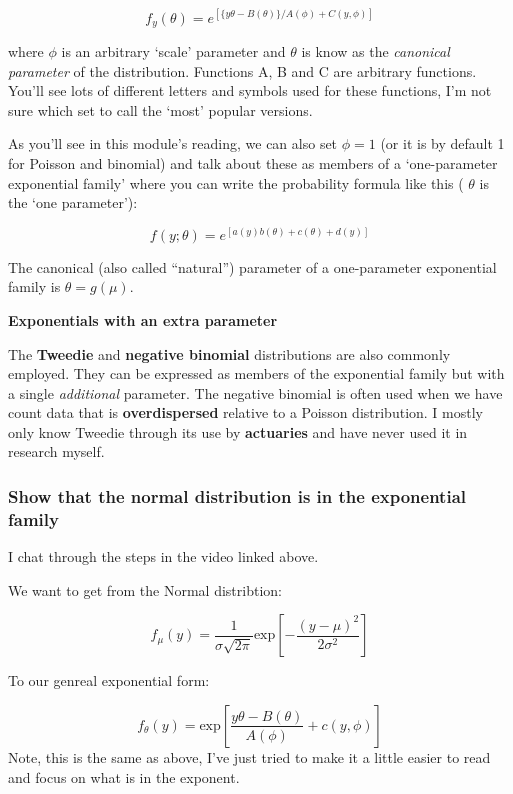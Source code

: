 \documentclass[
  openany]{book}
\begin{document}
\[f_y(\theta)=e^{[ \{y\theta-B(\theta)\}/A(\phi)+C(y, \phi)]}\]

where \(\phi\) is an arbitrary `scale' parameter and \(\theta\) is know as
the \emph{canonical parameter} of the distribution. Functions A, B and C are
arbitrary functions. You'll see lots of different letters and symbols
used for these functions, I'm not sure which set to call the `most'
popular versions.

As you'll see in this module's reading, we can also set \(\phi = 1\) (or
it is by default 1 for Poisson and binomial) and talk about these as
members of a `one-parameter exponential family' where you can write the
probability formula like this ( \(\theta\) is the `one parameter'):

\[f(y;\theta)=e^{[a(y)b(\theta)+c(\theta)+d(y)]}\]

The canonical (also called ``natural'') parameter of a one-parameter
exponential family is \(\theta=g(\mu)\).

\textbf{Exponentials with an extra parameter}

The \textbf{Tweedie} and \textbf{negative binomial} distributions are also
commonly employed. They can be expressed as members of the exponential
family but with a single \emph{additional} parameter. The negative binomial
is often used when we have count data that is \textbf{overdispersed} relative
to a Poisson distribution. I mostly only know Tweedie through its use by
\textbf{actuaries} and have never used it in research myself.

\hypertarget{show-that-the-normal-distribution-is-in-the-exponential-family}{%
\subsubsection{Show that the normal distribution is in the exponential family}\label{show-that-the-normal-distribution-is-in-the-exponential-family}}

I chat through the steps in the video linked above.

We want to get from the Normal distribtion:

\[f_\mu(y) =  \frac{1}{\sigma\sqrt{2\pi}}\text{exp}[-\frac{(y-\mu)^2}{2\sigma^2}]\]

To our genreal exponential form:

\[f_\theta(y) = \text{exp}[\frac{y\theta - B(\theta)}{A(\phi)} + c(y, \phi)]\]
Note, this is the same as above, I've just tried to make it a little easier to read and focus on what is in the exponent.
\end{document}
